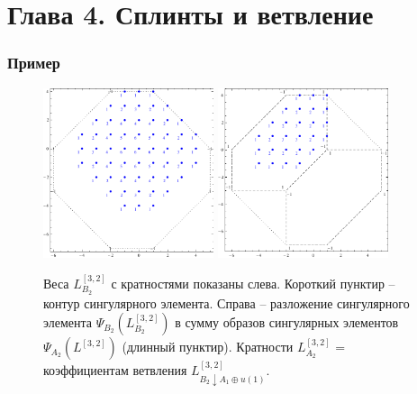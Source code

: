 \documentclass[pdftex]{beamer}
\theoremstyle{definition} \newtheorem{Def}{Определение}
\begin{document}
\section{Глава 4. Сплинты и ветвление}
\begin{frame}
  \frametitle{Пример}
  \vspace{-0.5cm}
\begin{figure}[h!bt]
  \hspace*{-1.2cm}

   \includegraphics[width=50mm]{figures/b2}
   \includegraphics[width=50mm]{figures/b2-a2-a1}
  \caption{Веса  $L^{[3,2]}_{B_{2}}$  с кратностями показаны слева. Короткий пунктир -- контур сингулярного элемента. Справа -- разложение сингулярного элемента $\Psi_{B_{2}}(L^{[3,2]}_{B_{2}})$ в сумму образов сингулярных элементов $\Psi_{A_{2}}(L^{[3,2]})$ (длинный пунктир). Кратности $L^{[3,2]}_{A_{2}}$ =  коэффициентам ветвления $L^{[3,2]}_{B_{2}\downarrow A_{1}\oplus u(1)}$.}

 \label{fig:b2_splint}
\end{figure}

\end{frame}
\end{document}
